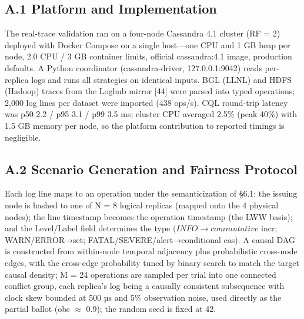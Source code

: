 \documentclass[11pt]{article}
\begin{document}
\subsection{A.1 Platform and Implementation}
The real-trace validation ran on a four-node Cassandra 4.1 cluster (RF = 2) deployed with Docker Compose on a single host—one CPU and 1 GB heap per node, 2.0 CPU / 3 GB container limits, official cassandra:4.1 image, production defaults. A Python coordinator (cassandra-driver, 127.0.0.1:9042) reads per-replica logs and runs all strategies on identical inputs. BGL (LLNL) and HDFS (Hadoop) traces from the Loghub mirror [44] were parsed into typed operations; 2,000 log lines per dataset were imported (438 ops/s). CQL round-trip latency was p50 2.2 / p95 3.1 / p99 3.5 ms; cluster CPU averaged 2.5\% (peak 40\%) with 1.5 GB memory per node, so the platform contribution to reported timings is negligible.

\subsection{A.2 Scenario Generation and Fairness Protocol}
Each log line maps to an operation under the semanticization of §6.1: the issuing node is hashed to one of N = 8 logical replicas (mapped onto the 4 physical nodes); the line timestamp becomes the operation timestamp (the LWW basis); and the Level/Label field determines the type $(INFO\rightarrow commutative$ incr; WARN/ERROR→set; FATAL/SEVERE/alert→conditional cas). A causal DAG is constructed from within-node temporal adjacency plus probabilistic cross-node edges, with the cross-edge probability tuned by binary search to match the target causal density; M = 24 operations are sampled per trial into one connected conflict group, each replica's log being a causally consistent subsequence with clock skew bounded at 500 µs and 5\% observation noise, used directly as the partial ballot (obs $\approx $ 0.9); the random seed is fixed at 42.
\end{document}
